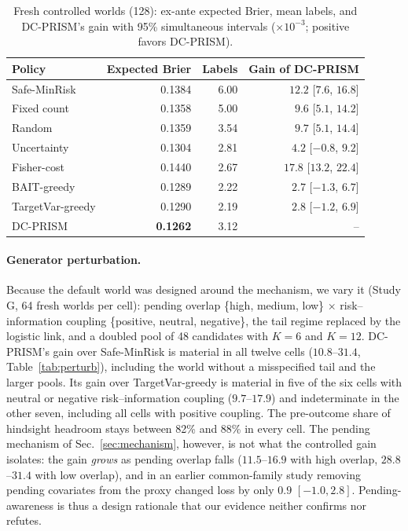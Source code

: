 \documentclass[runningheads]{llncs}
\begin{document}
\begin{table}[t]
\caption{Fresh controlled worlds (128): ex-ante expected Brier, mean labels, and DC-PRISM's gain with 95\% simultaneous intervals ($\times10^{-3}$; positive favors DC-PRISM).}
\label{tab:controlled}
\centering\small
\begin{tabular}{lrrr}
\toprule
Policy & Expected Brier & Labels & Gain of DC-PRISM \\
\midrule
Safe-MinRisk & 0.1384 & 6.00 & $12.2$ [$7.6$, $16.8$] \\
Fixed count & 0.1358 & 5.00 & $9.6$ [$5.1$, $14.2$] \\
Random & 0.1359 & 3.54 & $9.7$ [$5.1$, $14.4$] \\
Uncertainty & 0.1304 & 2.81 & $4.2$ [$-0.8$, $9.2$] \\
Fisher-cost & 0.1440 & 2.67 & $17.8$ [$13.2$, $22.4$] \\
BAIT-greedy & 0.1289 & 2.22 & $2.7$ [$-1.3$, $6.7$] \\
TargetVar-greedy & 0.1290 & 2.19 & $2.8$ [$-1.2$, $6.9$] \\
DC-PRISM & \textbf{0.1262} & 3.12 & -- \\
\bottomrule
\end{tabular}
\end{table}

\paragraph{Generator perturbation.} Because the default world was designed around the mechanism, we vary it (Study G, 64 fresh worlds per cell): pending overlap \{high, medium, low\} $\times$ risk--information coupling \{positive, neutral, negative\}, the tail regime replaced by the logistic link, and a doubled pool of 48 candidates with $K=6$ and $K=12$. DC-PRISM's gain over Safe-MinRisk is material in all twelve cells ($10.8$--$31.4$, Table~\ref{tab:perturb}), including the world without a misspecified tail and the larger pools. Its gain over TargetVar-greedy is material in five of the six cells with neutral or negative risk--information coupling ($9.7$--$17.9$) and indeterminate in the other seven, including all cells with positive coupling. The pre-outcome share of hindsight headroom stays between 82\% and 88\% in every cell. The pending mechanism of Sec.~\ref{sec:mechanism}, however, is not what the controlled gain isolates: the gain \emph{grows} as pending overlap falls ($11.5$--$16.9$ with high overlap, $28.8$--$31.4$ with low overlap), and in an earlier common-family study removing pending covariates from the proxy changed loss by only $0.9$ $[-1.0,2.8]$. Pending-awareness is thus a design rationale that our evidence neither confirms nor refutes.
\end{document}
